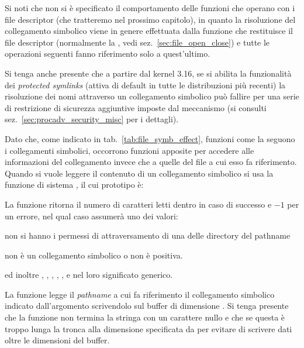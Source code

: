 
Si noti che non si è specificato il comportamento delle funzioni che operano
con i file descriptor (che tratteremo nel prossimo capitolo), in quanto la
risoluzione del collegamento simbolico viene in genere effettuata dalla
funzione che restituisce il file descriptor (normalmente la , vedi
sez.~\ref{sec:file_open_close}) e tutte le operazioni seguenti fanno
riferimento solo a quest'ultimo.

Si tenga anche presente che a partire dal kernel 3.16, se si abilita la
funzionalità dei \textit{protected symlinks} (attiva di default in tutte le
distribuzioni più recenti) la risoluzione dei nomi attraverso un collegamento
simbolico può fallire per una serie di restrizione di sicurezza aggiuntive
imposte dal meccanismo (si consulti sez.~\ref{sec:procadv_security_misc} per i
dettagli).

Dato che, come indicato in tab.~\ref{tab:file_symb_effect}, funzioni come la
 seguono i collegamenti simbolici, occorrono funzioni apposite per
accedere alle informazioni del collegamento invece che a quelle del file a cui
esso fa riferimento. Quando si vuole leggere il contenuto di un collegamento
simbolico si usa la funzione di sistema , il cui prototipo è:

\begin{funcproto}{
}
{La funzione ritorna il numero di caratteri letti dentro  in caso
  di successo e $-1$ per un errore,  nel qual caso  assumerà uno
  dei valori:
  \begin{errlist}
  \item[\errcode{EACCES}] non si hanno i permessi di attraversamento di una
    delle directory del pathname
  \item[\errcode{EINVAL}]  non è un collegamento simbolico
    o  non è positiva.
  \end{errlist} ed inoltre , , ,
  , ,  e 
  nel loro significato generico.}
\end{funcproto}

La funzione legge il \textit{pathname} a cui fa riferimento il collegamento
simbolico indicato dall'argomento  scrivendolo sul buffer
 di dimensione . Si tenga presente che la funzione non
termina la stringa con un carattere nullo e che se questa è troppo lunga la
tronca alla dimensione specificata da  per evitare di scrivere
dati oltre le dimensioni del buffer.

